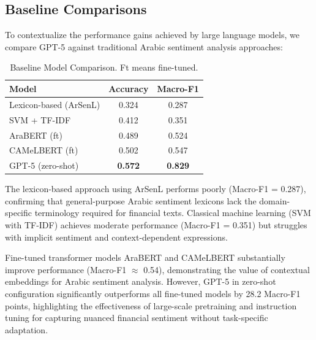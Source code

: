 \documentclass[10pt,a4paper]{article}
\begin{document}

\subsection{Baseline Comparisons}

To contextualize the performance gains achieved by large language models, we compare GPT-5 against traditional Arabic sentiment analysis approaches:

\begin{table}[!ht]
\begin{center}
\begin{tabular}{lcc}
\hline
\textbf{Model} & \textbf{Accuracy} & \textbf{Macro-F1} \\
\hline
Lexicon-based (ArSenL) & 0.324 & 0.287 \\
SVM + TF-IDF & 0.412 & 0.351 \\
AraBERT (ft) & 0.489 & 0.524 \\
CAMeLBERT (ft) & 0.502 & 0.547 \\
\hline
GPT-5 (zero-shot) & \textbf{0.572} & \textbf{0.829} \\
\hline
\end{tabular}
\caption{Baseline Model Comparison. Ft means fine-tuned.}
\label{tab:baselines}
\end{center}
\end{table}

The lexicon-based approach using ArSenL \cite{Badaro2018} performs poorly (Macro-F1 = 0.287), confirming that general-purpose Arabic sentiment lexicons lack the domain-specific terminology required for financial texts. Classical machine learning (SVM with TF-IDF) achieves moderate performance (Macro-F1 = 0.351) but struggles with implicit sentiment and context-dependent expressions.

Fine-tuned transformer models AraBERT \citep{Antoun2020} and CAMeLBERT \citep{Inoue2021} substantially improve performance (Macro-F1 $\approx$ 0.54), demonstrating the value of contextual embeddings for Arabic sentiment analysis. However, GPT-5 in zero-shot configuration significantly outperforms all fine-tuned models by 28.2 Macro-F1 points, highlighting the effectiveness of large-scale pretraining and instruction tuning for capturing nuanced financial sentiment without task-specific adaptation.
\end{document}
